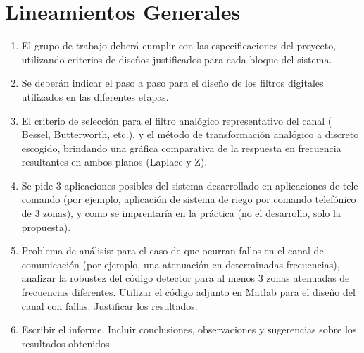 \section{Lineamientos Generales}
\begin{enumerate}[label=\alph*)]
  \item El grupo de trabajo deberá cumplir con las especificaciones del proyecto,
        utilizando criterios de diseños justificados para cada bloque del sistema.
  \item Se deberán indicar el paso a paso para el diseño de los filtros digitales utilizados
        en las diferentes etapas.
  \item El criterio de selección para el filtro analógico representativo del canal ( Bessel,
        Butterworth, etc.), y el método de transformación analógico a discreto escogido,
        brindando una gráfica comparativa de la respuesta en frecuencia resultantes en ambos
        planos (Laplace y Z).
  \item Se pide 3 aplicaciones posibles del sistema desarrollado en aplicaciones de tele
        comando (por ejemplo, aplicación de sistema de riego por comando telefónico de
        3 zonas), y como se imprentaría en la práctica (no el desarrollo, solo la propuesta).
  \item Problema de análisis: para el caso de que ocurran fallos en el canal de comunicación
        (por ejemplo, una atenuación en determinadas frecuencias), analizar la robustez del
        código detector para al menos 3 zonas atenuadas de frecuencias diferentes. Utilizar
        el código adjunto en Matlab para el diseño del canal con fallas. Justificar los
        resultados.
  \item Escribir el informe, Incluir conclusiones, observaciones y sugerencias sobre los
        resultados obtenidos
\end{enumerate}